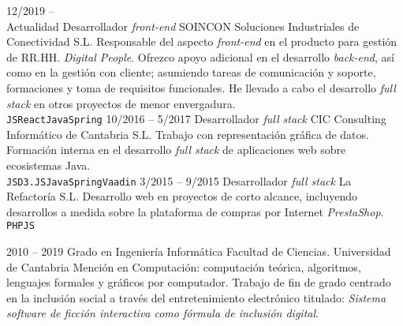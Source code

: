 \documentclass[9pt]{developercv} %
\begin{document}

%
%


\begin{entrylist}
	\entry
		{12/2019 --\\ Actualidad}
		{Desarrollador \emph{front-end}}
		{SOINCON Soluciones Industriales de Conectividad S.L.}
		{Responsable del aspecto \emph{front-end} en el producto para gestión de RR.HH. \emph{Digital People}. Ofrezco apoyo adicional en el desarrollo \emph{back-end}, así como en la gestión con cliente; asumiendo tareas de comunicación y soporte, formaciones y toma de requisitos funcionales. He llevado a cabo el desarrollo \emph{full stack} en otros proyectos de menor envergadura.\\ \texttt{JS}\slashsep\texttt{React}\slashsep\texttt{Java}\slashsep\texttt{Spring}}
	\entry
		{10/2016 -- 5/2017}
		{Desarrollador \emph{full stack}}
		{CIC Consulting Informático de Cantabria S.L.}
		{Trabajo con representación gráfica de datos. Formación interna en el desarrollo \emph{full stack} de aplicaciones web sobre ecosistemas Java.\\ \texttt{JS}\slashsep\texttt{D3.JS}\slashsep\texttt{Java}\slashsep\texttt{Spring}\slashsep\texttt{Vaadin}}
	\entry
		{3/2015 -- 9/2015}
		{Desarrollador \emph{full stack}}
		{La Refactoría S.L.}
		{Desarrollo web en proyectos de corto alcance, incluyendo desarrollos a medida sobre la plataforma de compras por Internet \emph{PrestaShop}.\\ \texttt{PHP}\slashsep\texttt{JS}}
\end{entrylist}

%
%


\begin{entrylist}
	\entry
		{2010 -- 2019}
		{Grado en Ingeniería Informática}
		{Facultad de Ciencias. Universidad de Cantabria}
		{Mención en Computación: computación teórica, algoritmos, lenguajes formales y gráficos por computador. Trabajo de fin de grado centrado en la inclusión social a través del entretenimiento electrónico titulado: \emph{Sistema software de ficción interactiva como fórmula de inclusión digital}.}
\end{entrylist}

%
%
\end{document}
